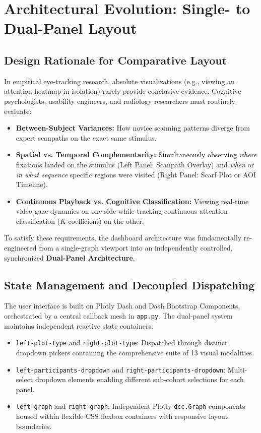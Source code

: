 \documentclass[11pt,a4paper]{article}
\begin{document}
\section{Architectural Evolution: Single- to Dual-Panel Layout}
\label{sec:dual_panel}

\subsection{Design Rationale for Comparative Layout}
In empirical eye-tracking research, absolute visualizations (e.g., viewing an attention heatmap in isolation) rarely provide conclusive evidence. Cognitive psychologists, usability engineers, and radiology researchers must routinely evaluate:
\begin{itemize}[noitemsep,topsep=2pt]
    \item \textbf{Between-Subject Variances:} How novice scanning patterns diverge from expert scanpaths on the exact same stimulus.
    \item \textbf{Spatial vs. Temporal Complementarity:} Simultaneously observing \textit{where} fixations landed on the stimulus (Left Panel: Scanpath Overlay) and \textit{when} or \textit{in what sequence} specific regions were visited (Right Panel: Scarf Plot or AOI Timeline).
    \item \textbf{Continuous Playback vs. Cognitive Classification:} Viewing real-time video gaze dynamics on one side while tracking continuous attention classification ($K$-coefficient) on the other.
\end{itemize}

To satisfy these requirements, the dashboard architecture was fundamentally re-engineered from a single-graph viewport into an independently controlled, synchronized \textbf{Dual-Panel Architecture}.

\subsection{State Management and Decoupled Dispatching}
The user interface is built on Plotly Dash and Dash Bootstrap Components, orchestrated by a central callback mesh in \texttt{app.py}. The dual-panel system maintains independent reactive state containers:
\begin{itemize}[noitemsep,topsep=2pt]
    \item \texttt{left-plot-type} and \texttt{right-plot-type}: Dispatched through distinct dropdown pickers containing the comprehensive suite of 13 visual modalities.
    \item \texttt{left-participants-dropdown} and \texttt{right-participants-dropdown}: Multi-select dropdown elements enabling different sub-cohort selections for each panel.
    \item \texttt{left-graph} and \texttt{right-graph}: Independent Plotly \texttt{dcc.Graph} components housed within flexible CSS flexbox containers with responsive layout boundaries.
\end{itemize}
\end{document}
